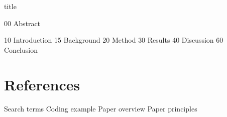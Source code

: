 \documentclass[a4paper,12pt]{article}
\begin{document}
{title}

\frontmatter

{00 Abstract}
\newpage

\tableofcontents
\newpage

\listoffigures
\listoftables


\mainmatter

{10 Introduction}
{15 Background}
{20 Method}
{30 Results}
{40 Discussion}
{60 Conclusion}


\section{References}
\printbibliography[heading = subbibnumbered, title = {Literature review}, keyword={litrev}]
\printbibliography[heading = subbibnumbered, title = {References not used in literature review}, notkeyword={litrev}]

\appendix
\begin{appendices}
\newpage
    {Search terms}
\newpage
    {Coding example}
\newpage
    {Paper overview}
\newpage
    {Paper principles}
\end{appendices}

\end{document}
